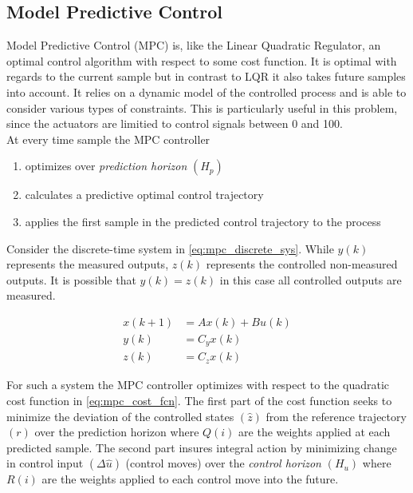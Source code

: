 \subsection{Model Predictive Control}
Model Predictive Control (MPC) is, like the Linear Quadratic Regulator, an optimal control algorithm with respect to some cost function. It is optimal with regards to the current sample but in contrast to LQR it also takes future samples into account. It relies on a dynamic model of the controlled process and is able to consider various types of constraints. This is particularly useful in this problem, since the actuators are limitied to control signals between 0 and 100.\\

At every time sample the MPC controller
\begin{enumerate}
	\item optimizes over \textit{prediction horizon} $(H_p)$
	\item calculates a predictive optimal control trajectory
	\item applies the first sample in the predicted control trajectory to the process
\end{enumerate}

\medskip

Consider the discrete-time system in \cref{eq:mpc_discrete_sys}. While $y(k)$ represents the measured outputs, $z(k)$ represents the controlled non-measured outputs. It is possible that $y(k) = z(k)$ in this case all controlled outputs are measured.

\begin{equation} \label{eq:mpc_discrete_sys}
	\begin{split}
		x(k+1) 	& = Ax(k) + Bu(k) \\
		y(k) 	& = C_yx(k) \\
		z(k) 	& = C_zx(k)
	\end{split}
\end{equation}

For such a system the MPC controller optimizes with respect to the quadratic cost function in \cref{eq:mpc_cost_fcn}. The first part of the cost function seeks to minimize the deviation of the controlled states $(\hat{z})$ from the reference trajectory $(r)$ over the prediction horizon where $Q(i)$ are the weights applied at each predicted sample. The second part insures integral action by minimizing change in control input $(\Delta \hat{u})$ (control moves) over the \textit{control horizon} $(H_u)$ where $R(i)$ are the weights applied to each control move into the future.

